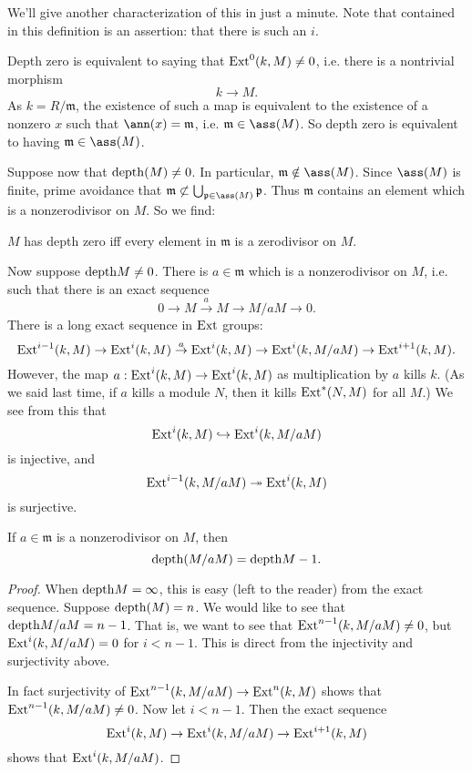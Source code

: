 We'll give another characterization of this in just a minute. Note that
contained in this definition is an assertion: that there is such an $i$.

\begin{example} 
Depth zero is equivalent to saying that $\mathrm{Ext}^0(k,M) \neq 0$, i.e. there is a
nontrivial morphism
\[ k \to M.  \]
As $k = R/\mathfrak{m}$, the existence of such a map is equivalent to the existence of a nonzero $x$
such that $\ann(x) = \mathfrak{m}$, i.e. $\mathfrak{m} \in \ass(M)$. So depth
zero is equivalent to having $\mathfrak{m} \in \ass(M)$.
\end{example} 

Suppose now that $\mathrm{depth}(M) \neq 0$. In particular, $\mathfrak{m} \notin
\ass(M)$. Since $\ass(M)$ is finite, prime avoidance that $\mathfrak{m}
\not\subset \bigcup_{\mathfrak{p} \in \ass(M)} \mathfrak{p}$. Thus
$\mathfrak{m}$ contains an element which is a nonzerodivisor on $M$.  So we find:

\begin{proposition} 
$M$ has depth zero iff every element in $\mathfrak{m}$ is a zerodivisor on $M$.
\end{proposition} 

Now suppose $\mathrm{depth} M \neq 0$. There is $a \in \mathfrak{m}$ which is a
nonzerodivisor on $M$, i.e.  such that there is
an exact sequence
\[ 0 \to M \stackrel{a}{\to} M \to M/aM \to 0.  \]
There is a long exact sequence in $\mathrm{Ext}$ groups:
\[\mathrm{Ext}^{i-1}(k,M) \to \mathrm{Ext}^i(k,M) \stackrel{a}{\to} \mathrm{Ext}^i(k,M) \to \mathrm{Ext}^i(k,
M/aM) \to \mathrm{Ext}^{i+1}(k,M)  .\]
However, the map $a: \mathrm{Ext}^i(k,M) \to \mathrm{Ext}^i(k,M)$ as multiplication by $a$
kills $k$. (As we said last time, if $a$ kills a module $N$, then it kills
$\mathrm{Ext}^*(N,M)$ for all $M$.) We see from this that
\[ \mathrm{Ext}^i(k,M) \hookrightarrow \mathrm{Ext}^i(k,M/aM)  \]
is injective, and 
\[ \mathrm{Ext}^{i-1}(k, M/aM) \twoheadrightarrow \mathrm{Ext}^i(k,M)  \]
is surjective.

\begin{corollary} 
If $a \in \mathfrak{m}$ is a nonzerodivisor on $M$, then 
\[ \mathrm{depth}(M/aM) = \mathrm{depth} M -1.  \]
\end{corollary} 
\begin{proof} 
When $\mathrm{depth} M = \infty$, this is easy (left to the reader) from the exact
sequence. Suppose $\mathrm{depth}(M) = n$. We would like to see that $\mathrm{depth} M/aM =
n-1$. That is, we want to see that $\mathrm{Ext}^{n-1}(k,M/aM) \neq 0$, but
$\mathrm{Ext}^i(k,M/aM) =
0$ for $i < n-1$. This is direct from the injectivity and surjectivity above. 

In fact surjectivity of $\mathrm{Ext}^{n-1}(k,M/aM) \to \mathrm{Ext}^n(k,M)$ shows that
$\mathrm{Ext}^{n-1}(k,M/aM) \neq 0$. Now let $i < n-1$. Then the exact sequence
\[ \mathrm{Ext}^i(k,M) \to \mathrm{Ext}^i(k,M/aM) \to \mathrm{Ext}^{i+1}(k,M)  \]
shows that $\mathrm{Ext}^i(k, M/aM)$.
\end{proof} 

